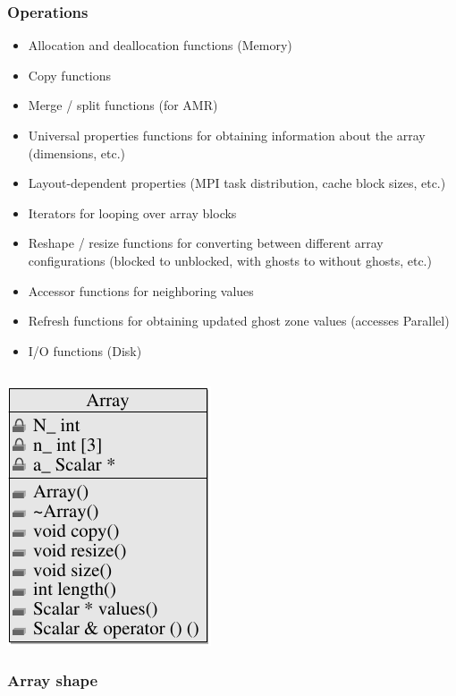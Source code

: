 \subsubsection{Operations}

\begin{itemize}
\item Allocation and deallocation functions (Memory)
\item Copy functions
\item Merge / split functions (for AMR)
\item Universal properties functions for obtaining information about
  the array (dimensions, etc.)
\item Layout-dependent properties (MPI task distribution, cache block
  sizes, etc.)
\item Iterators for looping over array blocks
\item Reshape / resize functions for converting between different
  array configurations (blocked to unblocked, with ghosts to without
  ghosts, etc.)
\item Accessor functions for neighboring values
\item Refresh functions for obtaining updated ghost zone values
  (accesses Parallel)
\item I/O functions (Disk)
\end{itemize}

\subsection{}

\centerline{\includegraphics{uml/array.pdf}}

\subsubsection{Array shape}

